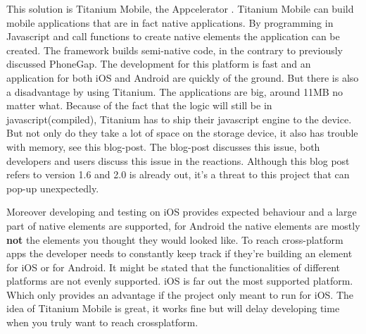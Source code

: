 This solution is Titanium Mobile, the Appcelerator \cite{Titanium-Appcelerator}. Titanium Mobile can build mobile applications that are in fact native applications. By programming in Javascript and call functions to create native elements the application can be created. The framework builds semi-native code, in the contrary to previously discussed PhoneGap. The development for this platform is fast and an application for both iOS and Android are quickly of the ground. But there is also a disadvantage by using Titanium. The applications are big, around 11MB no matter what. Because of the fact that the logic will still be in javascript(compiled), Titanium has to ship their javascript engine to the device. But not only do they take a lot of space on the storage device, it also has trouble with memory, see this blog-post\cite{memoryleak}. The blog-post discusses this issue, both developers and users discuss this issue in the reactions. Although this blog post refers to version 1.6 and 2.0 is already out, it's a threat to this project that can pop-up unexpectedly.

Moreover developing and testing on iOS provides expected behaviour and a large part of native elements are supported, for Android the native elements are mostly \textbf{not} the elements you thought they would looked like. To reach cross-platform apps the developer needs to constantly keep track if they're building an element for iOS or for Android. It might be stated that the functionalities of different platforms are not evenly supported. iOS is far out the most supported platform. Which only provides an advantage if the project only meant to run for iOS. The idea of Titanium Mobile is great, it works fine but will delay developing time when you truly want to reach crossplatform.

